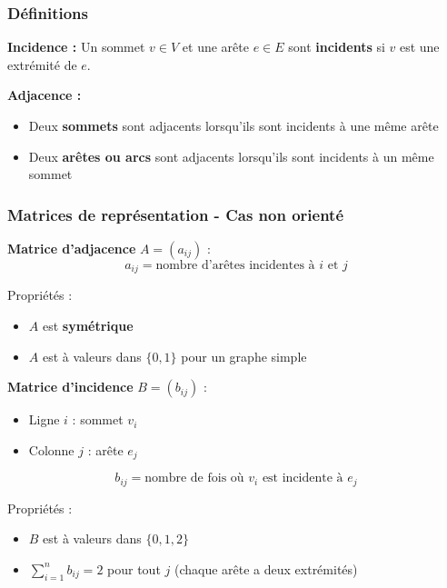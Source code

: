 \documentclass[12pt,a4paper]{article}
\begin{document}
\subsubsection{Définitions}

\begin{definition}
\textbf{Incidence :}
Un sommet $v \in V$ et une arête $e \in E$ sont \textbf{incidents} si $v$ est une extrémité de $e$.

\textbf{Adjacence :}
\begin{itemize}
    \item Deux \textcolor{titrebleu}{\textbf{sommets}} sont adjacents lorsqu'ils sont incidents à une même arête
    \item Deux \textcolor{defvert}{\textbf{arêtes ou arcs}} sont adjacents lorsqu'ils sont incidents à un même sommet
\end{itemize}
\end{definition}

\subsubsection{Matrices de représentation - Cas non orienté}

\begin{definition}
\textbf{Matrice d'adjacence} $A = (a_{ij})$ :
$$a_{ij} = \text{nombre d'arêtes incidentes à } i \text{ et } j$$

Propriétés :
\begin{itemize}
    \item $A$ est \textcolor{titrebleu}{\textbf{symétrique}}
    \item $A$ est à valeurs dans $\{0, 1\}$ pour un graphe simple
\end{itemize}

\textbf{Matrice d'incidence} $B = (b_{ij})$ :
\begin{itemize}
    \item Ligne $i$ : sommet $v_i$
    \item Colonne $j$ : arête $e_j$
\end{itemize}
$$b_{ij} = \text{nombre de fois où } v_i \text{ est incidente à } e_j$$

Propriétés :
\begin{itemize}
    \item $B$ est à valeurs dans $\{0, 1, 2\}$
    \item $\sum_{i=1}^{n} b_{ij} = 2$ pour tout $j$ (chaque arête a deux extrémités)
\end{itemize}
\end{definition}
\end{document}
